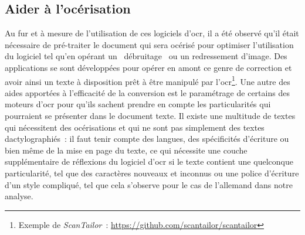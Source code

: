\subsection{Aider à l'océrisation}
Au fur et à mesure de l'utilisation de ces logiciels d'\acrshort{ocr}, il a été observé qu'il était nécessaire de pré-traiter le document qui sera océrisé pour optimiser l'utilisation du logiciel tel qu'en opérant un \og~débruitage~\fg{} ou un redressement d'image. Des applications se sont développées pour opérer en amont ce genre de correction et avoir ainsi un texte à disposition prêt à être manipulé par l'\acrshort{ocr}\footnote{Exemple de \emph{ScanTailor}~: \url{https://github.com/scantailor/scantailor}}. Une autre des aides apportées à l'efficacité de la conversion est le paramétrage de certains des moteurs d'\acrshort{ocr} pour qu'ils sachent prendre en compte les particularités qui pourraient se présenter dans le document texte. Il existe une multitude de textes qui nécessitent des océrisations et qui ne sont pas simplement des textes dactylographiés~: il faut tenir compte des langues, des spécificités d'écriture ou bien même de la mise en page du texte, ce qui nécessite une couche supplémentaire de réflexions du logiciel d'\acrshort{ocr} si le texte contient une quelconque particularité, tel que des caractères nouveaux et inconnus ou une police d'écriture d'un style compliqué, tel que cela s'observe pour le cas de l'allemand dans notre analyse.

